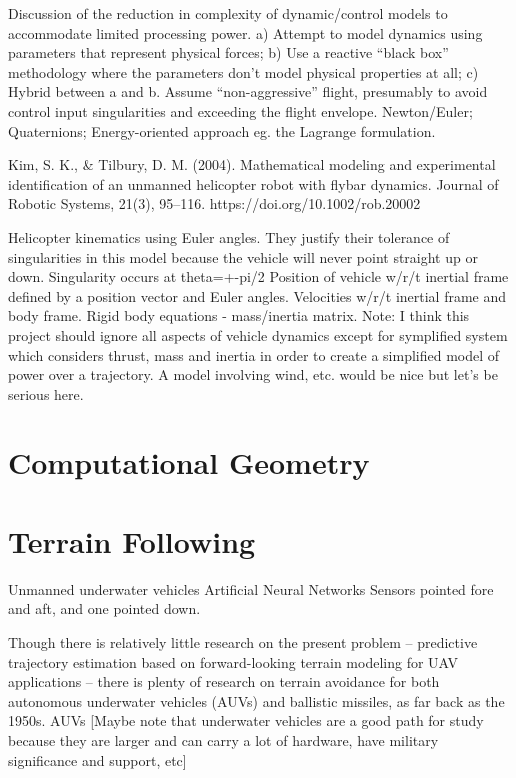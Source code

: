 \documentclass[10pt]{article}
\begin{document}
Discussion of the reduction in complexity of dynamic/control models to accommodate limited processing power. 
a) Attempt to model dynamics using parameters that represent physical forces; b) Use a reactive “black box” methodology where the parameters don’t model physical properties at all; c) Hybrid between a and b.
Assume “non-aggressive” flight, presumably to avoid control input singularities and exceeding the flight envelope.
Newton/Euler; Quaternions; Energy-oriented approach eg. the Lagrange formulation.

\cite{Kim2004}
Kim, S. K., \& Tilbury, D. M. (2004). Mathematical modeling and experimental identification of an unmanned helicopter robot with flybar dynamics. Journal of Robotic Systems, 21(3), 95–116. https://doi.org/10.1002/rob.20002

Helicopter kinematics using Euler angles. They justify their tolerance of singularities in this model because the vehicle will never point straight up or down. Singularity occurs at theta=+-pi/2
Position of vehicle w/r/t inertial frame defined by a position vector and Euler angles.
Velocities w/r/t inertial frame and body frame.
Rigid body equations - mass/inertia matrix.
Note: I think this project should ignore all aspects of vehicle dynamics except for symplified system which considers thrust, mass and inertia in order to create a simplified model of power over a trajectory. A model involving wind, etc. would be nice but let’s be serious here.


\section{Computational Geometry}



\section{Terrain Following}

Unmanned underwater vehicles
Artificial Neural Networks
Sensors pointed fore and aft, and one pointed down.

Though there is relatively little research on the present problem -- predictive trajectory estimation based on forward-looking terrain modeling for UAV applications -- there is plenty of research on terrain avoidance for both autonomous underwater vehicles (AUVs) and ballistic missiles, as far back as the 1950s. 
AUVs
[Maybe note that underwater vehicles are a good path for study because they are larger and can carry a lot of hardware, have military significance and support, etc]
\end{document}
